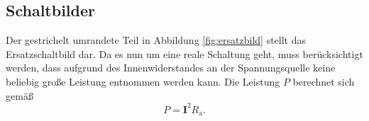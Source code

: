 \subsection{Schaltbilder}
Der gestrichelt umrandete Teil in Abbildung \ref{fig:ersatzbild} stellt das
Ersatzschaltbild dar.
Da es nun um eine reale Schaltung geht, muss berücksichtigt werden, dass
aufgrund des Innenwiderstandes an der Spannungsquelle keine beliebig große
Leistung entnommen werden kann. Die Leistung $P$ berechnet sich gemäß
\begin{equation}
      P = \symbf{I}^2 R_\text{a}.
\end{equation}
